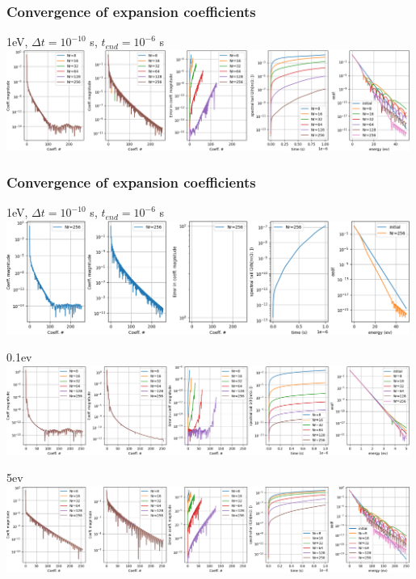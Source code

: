 \documentclass[mathserif, aspectratio=169]{beamer}
\begin{document}
\begin{frame}
\end{frame}


\begin{frame}
\frametitle{Convergence of expansion coefficients}
1eV, $\Delta t = 10^{-10}$ s, $t_{end} = 10^{-6}$ s\\
\includegraphics[width=0.99\textwidth]{figures/expansion_1ev.png}
\end{frame}

\begin{frame}
\frametitle{Convergence of expansion coefficients}
1eV, $\Delta t = 10^{-10}$ s, $t_{end} = 10^{-6}$ s\\
\includegraphics[width=0.99\textwidth]{figures/expansion_1ev_256.png}
\end{frame}

\begin{frame}
0.1ev\\
\includegraphics[width=0.99\textwidth]{figures/expansion_01ev.png}

5ev \\
\includegraphics[width=0.99\textwidth]{figures/expansion_5ev.png}
\end{frame}
\end{document}
